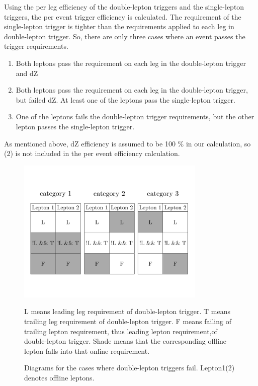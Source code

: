 Using the per leg efficiency of the double-lepton triggers and the single-lepton triggers, 
the per event trigger efficiency is calculated. The requirement of the 
single-lepton trigger is tighter than the requirements applied to each leg in 
double-lepton trigger. 
So, there are only three cases where an event passes the trigger requirements. 
\begin{enumerate}
\item Both leptons pass the requirement on each leg in the double-lepton trigger and dZ 
\item Both leptons pass the requirement on each leg in the double-lepton trigger, 
      but failed dZ. 
      At least one of the leptons pass the single-lepton trigger.
\item One of the leptons fails the double-lepton trigger requirements, 
      but the other lepton passes the single-lepton trigger.
\end{enumerate}
As mentioned above, dZ efficiency is assumed to be 100 \% in our calculation, 
so (2) is not included in the per event efficiency calculation.  
\begin{figure}[t]
\centering
\includegraphics[width=0.8\textwidth]{figures/TriggerEfficiencyDiagram.pdf}
\caption{ Diagrams for the cases where double-lepton triggers fail. Lepton1(2) 
denotes offline leptons. } 
L means leading leg requirement of double-lepton trigger. 
T means trailing leg requirement of double-lepton trigger. F means failing of 
trailing lepton requirement, thus leading lepton requirement,of double-lepton trigger.
Shade means that the corresponding offline lepton falls into that online requirement.
\label{fig:trg_eff_diagram}
\end{figure}

